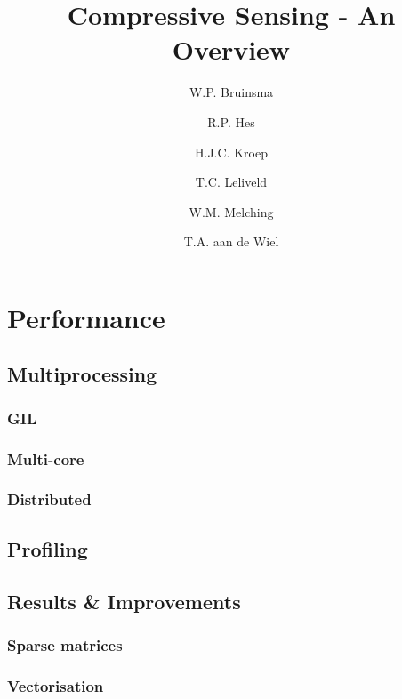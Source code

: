 \documentclass[a4paper, openany, oneside]{memoir}
\title{Compressive Sensing - An Overview}
\author{W.P. Bruinsma \and R.P. Hes \and H.J.C. Kroep \and T.C. Leliveld \and W.M. Melching \and T.A. aan de Wiel}
\begin{document}
\chapter{Performance}

\section{Multiprocessing}
\label{sec:multiprocessing}

\subsection{GIL}
\label{sec:gil}

\subsection{Multi-core}
\label{sec:multi-core}

\subsection{Distributed}
\label{sec:distributed}

\section{Profiling}
\label{sec:profiling}

\section{Results \& Improvements}
\label{sec:results}

\subsection{Sparse matrices}
\label{sec:sparse-matrices}

\subsection{Vectorisation}
\label{sec:vectorisation}
\end{document}
